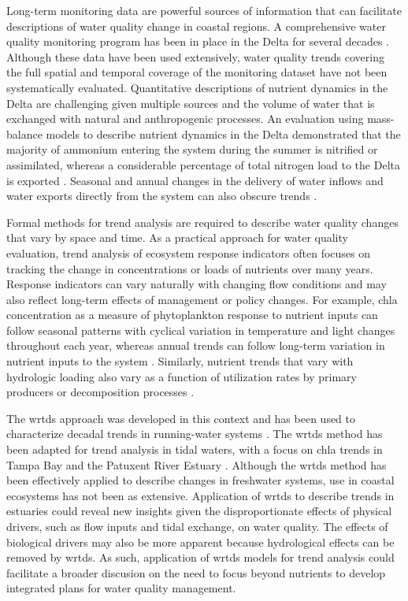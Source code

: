 \documentclass[letterpaper,12pt,oneside]{article}\usepackage[]{graphicx}\usepackage[]{color}
\begin{document}
Long-term monitoring data are powerful sources of information that can facilitate descriptions of water quality change in coastal regions. A comprehensive water quality monitoring program has been in place in the Delta for several decades \citep[\cref{fig:delt_map},][]{IEP13}.  Although these data have been used extensively, water quality trends covering the full spatial and temporal coverage of the monitoring dataset have not been systematically evaluated. Quantitative descriptions of nutrient dynamics in the Delta are challenging given multiple sources and the volume of water that is exchanged with natural and anthropogenic processes.  An evaluation using mass-balance models to describe nutrient dynamics in the Delta demonstrated that the majority of ammonium entering the system during the summer is nitrified or assimilated, whereas a considerable percentage of total nitrogen load to the Delta is exported \citep{Novick15}. Seasonal and annual changes in the delivery of water inflows and water exports directly from the system can also obscure trends \citep{Jassby00,Jassby08}.  

Formal methods for trend analysis are required to describe water quality changes that vary by space and time. As a practical approach for water quality evaluation, trend analysis of ecosystem response indicators often focuses on tracking the change in concentrations or loads of nutrients over many years. Response indicators can vary naturally with changing flow conditions and may also reflect long-term effects of management or policy changes. For example, \ac{chla} concentration as a measure of phytoplankton response to nutrient inputs can follow seasonal patterns with cyclical variation in temperature and light changes throughout each year, whereas annual trends can follow long-term variation in nutrient inputs to the system \citep{Cloern96,Cloern10}. Similarly, nutrient trends that vary with hydrologic loading also vary as a function of utilization rates by primary producers or decomposition processes \citep{Sakamoto89,Schultz08,Harding16}.  

The \ac{wrtds} approach was developed in this context and has been used to characterize decadal trends in running-water systems \citep{Hirsch10,Sprague11,Medalie12,Hirsch14,Pellerin14,Zhang16}.  The \ac{wrtds} method has been adapted for trend analysis in tidal waters, with a focus on \ac{chla} trends in Tampa Bay \citep{Beck15} and the Patuxent River Estuary \citep{Beck17}. Although the \ac{wrtds} method has been effectively applied to describe changes in freshwater systems, use in coastal ecosystems has not been as extensive.  Application of \ac{wrtds} to describe trends in estuaries could reveal new insights given the disproportionate effects of physical drivers, such as flow inputs and tidal exchange, on water quality. The effects of biological drivers may also be more apparent because hydrological effects can be removed by \ac{wrtds}.  As such, application of \ac{wrtds} models for trend analysis could facilitate a broader discusion on the need to focus beyond nutrients to develop integrated plans for water quality management. 
\end{document}
